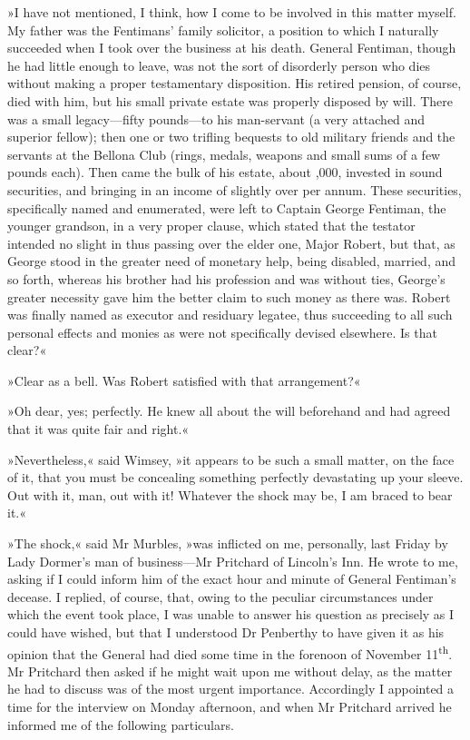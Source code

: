 »I have not mentioned, I think, how I come to be involved in this matter myself. My father was the Fentimans' family solicitor, a position to which I naturally succeeded when I took over the business at his death. General Fentiman, though he had little enough to leave, was not the sort of disorderly person who dies without making a proper testamentary disposition. His retired pension, of course, died with him, but his small private estate was properly disposed by will. There was a small legacy—fifty pounds—to his man-servant (a very attached and superior fellow); then one or two trifling bequests to old military friends and the servants at the Bellona Club (rings, medals, weapons and small sums of a few pounds each). Then came the bulk of his estate, about ,000, invested in sound securities, and bringing in an income of slightly over  per annum. These securities, specifically named and enumerated, were left to Captain George Fentiman, the younger grandson, in a very proper clause, which stated that the testator intended no slight in thus passing over the elder one, Major Robert, but that, as George stood in the greater need of monetary help, being disabled, married, and so forth, whereas his brother had his profession and was without ties, George's greater necessity gave him the better claim to such money as there was. Robert was finally named as executor and residuary legatee, thus succeeding to all such personal effects and monies as were not specifically devised elsewhere. Is that clear?«

»Clear as a bell. Was Robert satisfied with that arrangement?«

»Oh dear, yes; perfectly. He knew all about the will beforehand and had agreed that it was quite fair and right.«

»Nevertheless,« said Wimsey, »it appears to be such a small matter, on the face of it, that you must be concealing something perfectly devastating up your sleeve. Out with it, man, out with it! Whatever the shock may be, I am braced to bear it.«

»The shock,« said Mr Murbles, »was inflicted on me, personally, last Friday by Lady Dormer's man of business—Mr Pritchard of Lincoln's Inn. He wrote to me, asking if I could inform him of the exact hour and minute of General Fentiman's decease. I replied, of course, that, owing to the peculiar circumstances under which the event took place, I was unable to answer his question as precisely as I could have wished, but that I understood Dr Penberthy to have given it as his opinion that the General had died some time in the forenoon of November  11\textsuperscript{th}. Mr Pritchard then asked if he might wait upon me without delay, as the matter he had to discuss was of the most urgent importance. Accordingly I appointed a time for the interview on Monday afternoon, and when Mr Pritchard arrived he informed me of the following particulars.

